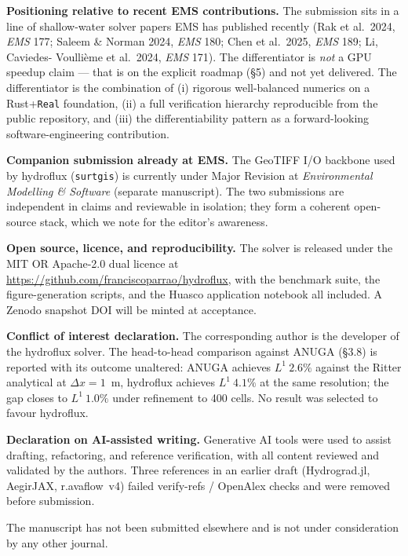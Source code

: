 \documentclass[11pt]{article}
\begin{document}
\textbf{Positioning relative to recent EMS contributions.} The
submission sits in a line of shallow-water solver papers EMS has
published recently (Rak et al.\ 2024, \emph{EMS} 177; Saleem \& Norman
2024, \emph{EMS} 180; Chen et al.\ 2025, \emph{EMS} 189; Li, Caviedes-
Voullième et al.\ 2024, \emph{EMS} 171). The differentiator is
\emph{not} a GPU speedup claim --- that is on the explicit roadmap
(§5) and not yet delivered. The differentiator is the combination of
(i) rigorous well-balanced numerics on a Rust+\texttt{Real}
foundation, (ii) a full verification hierarchy reproducible from the
public repository, and (iii) the differentiability pattern as a
forward-looking software-engineering contribution.

\textbf{Companion submission already at EMS.} The GeoTIFF I/O backbone
used by hydroflux (\texttt{surtgis}) is currently under Major Revision
at \emph{Environmental Modelling \& Software} (separate manuscript).
The two submissions are independent in claims and reviewable in
isolation; they form a coherent open-source stack, which we note for
the editor's awareness.

\textbf{Open source, licence, and reproducibility.} The solver is
released under the MIT OR Apache-2.0 dual licence at
\url{https://github.com/franciscoparrao/hydroflux}, with the benchmark
suite, the figure-generation scripts, and the Huasco application
notebook all included. A Zenodo snapshot DOI will be minted at
acceptance.

\textbf{Conflict of interest declaration.} The corresponding author is
the developer of the hydroflux solver. The head-to-head comparison
against ANUGA (§3.8) is reported with its outcome unaltered: ANUGA
achieves $L^1\ 2.6\%$ against the Ritter analytical at $\Delta x =
1$~m, hydroflux achieves $L^1\ 4.1\%$ at the same resolution; the gap
closes to $L^1\ 1.0\%$ under refinement to 400 cells. No result was
selected to favour hydroflux.

\textbf{Declaration on AI-assisted writing.} Generative AI tools were
used to assist drafting, refactoring, and reference verification,
with all content reviewed and validated by the authors. Three
references in an earlier draft (Hydrograd.jl, AegirJAX, r.avaflow~v4)
failed verify-refs / OpenAlex checks and were removed before submission.

The manuscript has not been submitted elsewhere and is not under
consideration by any other journal.
\end{document}
